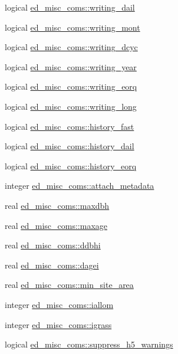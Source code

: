 \begin{DoxyCompactItemize}
\item 
logical \hyperlink{namespaceed__misc__coms_a764eed5843c91ba68cb8453f201a5ba1}{ed\+\_\+misc\+\_\+coms\+::writing\+\_\+dail}
\item 
logical \hyperlink{namespaceed__misc__coms_ae91dab0d5d9e096bc630d164c0cf3aca}{ed\+\_\+misc\+\_\+coms\+::writing\+\_\+mont}
\item 
logical \hyperlink{namespaceed__misc__coms_aa4e455b013ba15da273c561474bc6118}{ed\+\_\+misc\+\_\+coms\+::writing\+\_\+dcyc}
\item 
logical \hyperlink{namespaceed__misc__coms_a4a877b72d09710032e8e261e36fdf9d8}{ed\+\_\+misc\+\_\+coms\+::writing\+\_\+year}
\item 
logical \hyperlink{namespaceed__misc__coms_a4e9b25f178cff889c0a1f7c6cc3b0f8c}{ed\+\_\+misc\+\_\+coms\+::writing\+\_\+eorq}
\item 
logical \hyperlink{namespaceed__misc__coms_a907b21c9fa6b3ae894b1fb49d8089935}{ed\+\_\+misc\+\_\+coms\+::writing\+\_\+long}
\item 
logical \hyperlink{namespaceed__misc__coms_acb498f82b7899320d942df34d73ec0ba}{ed\+\_\+misc\+\_\+coms\+::history\+\_\+fast}
\item 
logical \hyperlink{namespaceed__misc__coms_a1f98996eedfb5e2b3f0934e331a17583}{ed\+\_\+misc\+\_\+coms\+::history\+\_\+dail}
\item 
logical \hyperlink{namespaceed__misc__coms_a57aea3af751f0f655977bdd275392f94}{ed\+\_\+misc\+\_\+coms\+::history\+\_\+eorq}
\item 
integer \hyperlink{namespaceed__misc__coms_afb7de717ec53503d518604da7c021e1a}{ed\+\_\+misc\+\_\+coms\+::attach\+\_\+metadata}
\item 
real \hyperlink{namespaceed__misc__coms_a7e0fabd988ab576a04f8e607605cb4d7}{ed\+\_\+misc\+\_\+coms\+::maxdbh}
\item 
real \hyperlink{namespaceed__misc__coms_a33103582327db251ac53c37169379421}{ed\+\_\+misc\+\_\+coms\+::maxage}
\item 
real \hyperlink{namespaceed__misc__coms_addd21c151c013090994c5471206d6595}{ed\+\_\+misc\+\_\+coms\+::ddbhi}
\item 
real \hyperlink{namespaceed__misc__coms_a6dedccb6bd1fa55c04ad14eee4ddb95e}{ed\+\_\+misc\+\_\+coms\+::dagei}
\item 
real \hyperlink{namespaceed__misc__coms_ab0d2bac6650ffb4e0fefdb6380ae1c38}{ed\+\_\+misc\+\_\+coms\+::min\+\_\+site\+\_\+area}
\item 
integer \hyperlink{namespaceed__misc__coms_a63c098b4f6d8333d0ce468bc75088832}{ed\+\_\+misc\+\_\+coms\+::iallom}
\item 
integer \hyperlink{namespaceed__misc__coms_a6494bf5748198e80e5a1af43ec3f497f}{ed\+\_\+misc\+\_\+coms\+::igrass}
\item 
logical \hyperlink{namespaceed__misc__coms_ac658bfc9ea442f9905a0a857e1a82f96}{ed\+\_\+misc\+\_\+coms\+::suppress\+\_\+h5\+\_\+warnings}
\end{DoxyCompactItemize}
